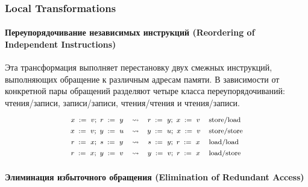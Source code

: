 \subsubsection{Local Transformations}

\paragraph{
Переупорядочивание независимых инструкций
(Reordering of Independent Instructions)
} 

Эта трансформация выполняет перестановку 
двух смежных инструкций, выполняющих обращение к 
различным адресам памяти. 
В зависимости от конкретной пары обращений разделяют 
четыре класса переупорядочиваний:
чтения/записи, записи/записи,
чтения/чтения и чтения/записи. 
%
\[\def\arraystretch{1.4}\footnotesize
  \begin{array}{cccl} 

      \writeInst{}{x}{v} \seq \readInst{}{r}{y} 
    & \leadsto 
    & \readInst{}{r}{y} \seq \writeInst{}{x}{v}
    & \text{store/load}  \\ 

      \writeInst{}{x}{v} \seq \writeInst{}{y}{u} 
    & \leadsto 
    & \writeInst{}{y}{u} \seq \writeInst{}{x}{v}
    & \text{store/store}  \\ 

      \readInst{}{r}{x} \seq \readInst{}{s}{y} 
    & \leadsto 
    & \readInst{}{s}{y} \seq \readInst{}{r}{x}
    & \text{load/load}  \\ 

      \readInst{}{r}{x} \seq \writeInst{}{y}{v} 
    & \leadsto 
    & \writeInst{}{y}{v} \seq \readInst{}{r}{x}
    & \text{load/store}  \\ 

  \end{array}
\]

\paragraph{
Элиминация избыточного обращения
(Elimination of Redundant Access)
} 

